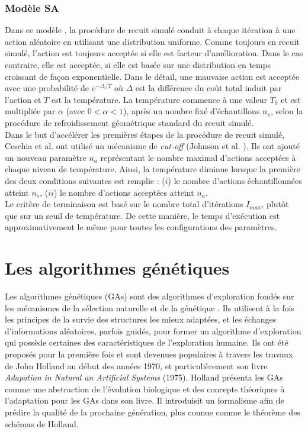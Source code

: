 		\subsubsection{Modèle SA}
		Dans ce modèle \cite{ceschia}, la procédure de recuit simulé conduit à chaque itération à une action aléatoire en utilisant une distribution uniforme. Comme toujours en recuit simulé, l'action est toujours acceptée si elle est facteur d'amélioration. Dans le cas contraire, elle est acceptée, si elle est basée sur une distribution en temps croissant de façon exponentielle. Dans le détail, une mauvaise action est acceptée avec une probabilité de $e^{-\Delta/T}$ où $\Delta$ est la différence du coût total induit par l'action et $T$ est la température. La température commence à une valeur $T_{0}$ et est multipliée par $\alpha$ (avec $0 < \alpha < 1$), après un nombre fixé d'échantillons $n_{s}$, selon la procédure de refroidissement géométrique standard du recuit simulé. \\
		\hspace*{.5cm} Dans le but d'accélérer les premières étapes de la procédure de recuit simulé,  Ceschia et al. ont utilisé un mécanisme de \emph{cut-off} (Johnson et al. \cite{johnson}). Ils ont ajouté un nouveau paramètre $n_{a}$ représentant le nombre maximal d'actions acceptées à chaque niveau de température. Ainsi, la température diminue lorsque la première des deux conditions suivantes est remplie : ($i$) le nombre d'actions échantillonnées atteint $n_{s}$, ($ii$) le nombre d'actions acceptées atteint $n_{a}$. \\
		\hspace*{.5cm} Le critère de terminaison est basé sur le nombre total d'itérations $I_{max}$, plutôt que sur un seuil de température. De cette manière, le temps d'exécution est approximativement le même pour toutes les configurations des paramètres.
		
	\section{Les algorithmes génétiques}
		
	Les algorithmes génétiques (GAs) sont des algorithmes d’exploration fondés sur les mécanismes de la sélection naturelle et de la génétique \cite{holland1} \cite{holland2}. Ils utilisent à la fois les principes de la survie des structures les mieux adaptées, et les échanges d’informations aléatoires, parfois guidés, pour former un algorithme d’exploration qui possède certaines des caractéristiques de l’exploration humaine. Ils ont été proposés pour la première fois et sont devenues populaires à travers les travaux de John Holland au début des années 1970, et particulièrement son livre \emph{Adapation in Natural an Artificial Systems} (1975). Holland présenta les GAs comme une abstraction de l'évolution biologique et des concepts théoriques à l'adaptation pour les GAs dans son livre. Il introduisit un formalisme afin de prédire la qualité de la prochaine génération, plus connue comme le théorème des schémas de Holland.
	

